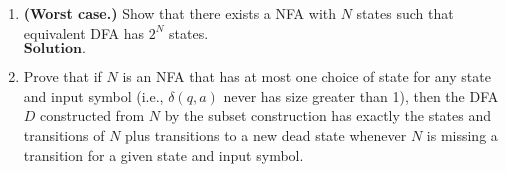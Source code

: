 \documentclass{article}
\theoremstyle{remark}
\begin{document}
\begin{enumerate}
    \item \textbf{(Worst case.)} Show that there exists a NFA with $N$ states such that equivalent DFA  
    has $2^N$ states.\\
    $\textbf{Solution.}$


    \item Prove that if \( N \) is an NFA that has at most one choice of state for any state and input symbol (i.e., \(\delta(q, a)\) never has size greater than 1), 
    then the DFA \( D \) constructed from \( N \) by the subset construction has exactly the states and transitions of \( N \) plus transitions to a new dead state whenever \( N \) is missing a transition
    for a given state and input symbol.
\end{enumerate}
\end{document}
